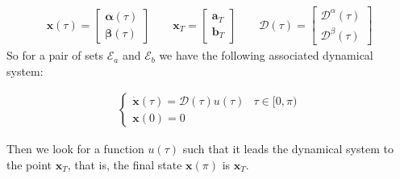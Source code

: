 \begin{gather}
    \bm{x}(\tau) = \begin{bmatrix}
        \bm{\alpha}(\tau) \\  \bm{\beta}(\tau)
    \end{bmatrix} \hspace{2em}
    \bm{x}_T = \begin{bmatrix}
        \bm{a}_T \\  \bm{b}_T
    \end{bmatrix} \hspace{2em}
    \bm{\mathcal{D}}(\tau) = \begin{bmatrix}
        \bm{\mathcal{D}}^\alpha(\tau) \\  
        \bm{\mathcal{D}}^\beta(\tau)
    \end{bmatrix}     
\end{gather}
So for a pair of sets $ \mathcal {E} _a $ and $ \mathcal {E} _b $ we have the following associated dynamical system:

\begin{gather}
    \begin{cases}
        \dot{\bm{x}}(\tau) = \bm{\mathcal{D}}(\tau) u(\tau)  & \tau \in [0,\pi)\\
        \bm{x}(0) = {0}
    \end{cases}
\end{gather}

Then we look for a function $ u (\tau) $ such that it leads the dynamical system to the point $ \bm {x} _T $, that is, the final state $ \bm {x} (\pi) $ is $ \bm {x}_T $.

